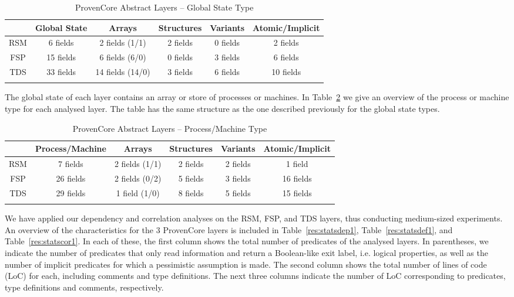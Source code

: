 \documentclass[11pt]{article}
\def\pcore{\textsf{ProvenCore}}
\begin{document}
\begin{table}[hbtp]
\caption{{\pcore} Abstract Layers -- Global State Type}
\centering
\begin{tabular}{cccccc} \toprule
    {}       & {Global State} &{Arrays}          & {Structures} & {Variants}     & {Atomic/Implicit}  
    \\ \midrule
    RSM      & 6 fields       & 2 fields (1/1)    & 2 fields     &  0 fields      & 2 fields        \\
    FSP      & 15 fields      & 6 fields (6/0)    & 0 fields     &  3 fields      & 6 fields         \\ 
    TDS      & 33 fields      & 14 fields (14/0)  & 3 fields     &  6 fields      & 10 fields        \\\bottomrule\\
\end{tabular}
\label{res:fspstate}
\end{table}

The global state of each layer contains an array or store of processes or machines.
In Table~\ref{res:fspproc} we give an overview of the process or machine type for 
each analysed layer. The table has the same structure as the one described 
previously for the global state types.


\begin{table}[hbtp]
\caption{{\pcore} Abstract Layers -- Process/Machine Type}
\centering
\begin{tabular}{cccccc} \toprule
    {}       & {Process/Machine} &{Arrays}        & {Structures} & {Variants}    & {Atomic/Implicit}  
    \\ \midrule
    RSM      & 7 fields          & 2 fields (1/1)   & 2 fields     & 2 fields      & 1 field          \\
    FSP      & 26 fields         & 2 fields (0/2)   & 5 fields     & 3 fields      & 16 fields        \\ 
    TDS      & 29 fields         & 1 field  (1/0)   & 8 fields     & 5 fields      & 15 fields         \\ \bottomrule\\
\end{tabular}
\label{res:fspproc}
\end{table}

We have applied our dependency and correlation analyses on the RSM, FSP, and TDS 
layers, thus conducting medium-sized experiments. An overview of the characteristics 
for the 3 {\pcore} layers is included in Table~\ref{res:statsdep1}, 
Table~\ref{res:statsdef1}, and Table~\ref{res:statscor1}. In each of these, the first 
column shows the total number of predicates of the analysed layers. In parentheses, we 
indicate the number of predicates that only read information and return a 
Boolean-like exit label, i.e. logical 
properties, as well as the number of implicit predicates for which a 
pessimistic assumption is made. The second column shows the total number 
of lines of code (LoC) for each, including comments and type definitions. 
The next three columns indicate the number of LoC 
corresponding to predicates, type definitions and comments, respectively.
\end{document}
